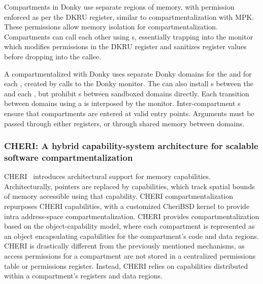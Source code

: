 Compartments in Donky use separate regions of memory, with permission
enforced as per the DKRU register, similar to compartmentalization with
MPK.
These permissions allow memory isolation for compartmentalization.
Compartments can call each other using s, essentially trapping
into the monitor which modifies permissions in the DKRU register and
sanitizes register values before dropping into the callee.

A \browser compartmentalized with Donky uses separate Donky domains for the 
\renderer and for each \sandbox, created by calls to the Donky monitor.
The \browser can also install s between the \renderer and each
\sandbox, but prohibit s between sandboxed domains directly.
Each transition between domains using a  is interposed by the
monitor.
Inter-compartment s ensure that compartments are entered at
valid entry points.
Arguments must be passed through either registers, or through shared memory
between domains.

\subsubsection{CHERI: A hybrid capability-system architecture for scalable 
            software compartmentalization}
CHERI~\cite{WoodruffWCMADLNNR14} introduces architectural support for 
memory capabilities.
Architecturally, pointers are replaced by capabilities, which track 
spatial bounds of memory accessible using that capability. 
CHERI compartmentalization~\cite{WatsonWNMACDDGL15} repurposes 
CHERI capabilities, with a customized CheriBSD
kernel to provide intra address-space compartmentalization.
CHERI provides compartmentalization based on the object-capability model, 
where each compartment is represented as an object encapsulating capabilities
for the compartment's code and data regions.
CHERI is drastically different from the previously mentioned mechanisms,
as access permissions for a compartment are not stored in a centralized
permissions table or permissions register.
Instead, CHERI relies on capabilities distributed within a compartment's 
registers and data regions.

